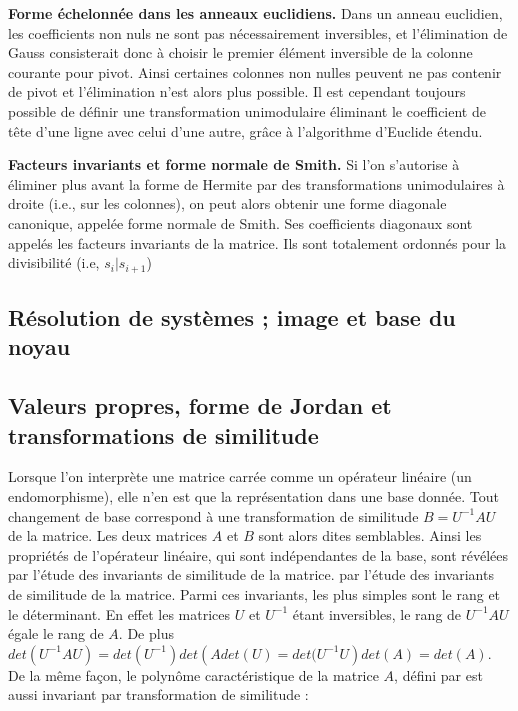 \begin{flushleft}
\textbf{Forme échelonnée dans les anneaux euclidiens.} Dans un anneau euclidien, les coefficients non nuls ne sont pas nécessairement inversibles, et l’élimination de Gauss consisterait donc à choisir le premier élément inversible de la colonne courante pour pivot. Ainsi certaines colonnes non nulles peuvent ne pas contenir
de pivot et l’élimination n’est alors plus possible. Il est cependant toujours possible de définir une transformation unimodulaire éliminant le coefficient de tête d’une ligne avec celui d’une autre, grâce à
l’algorithme d’Euclide étendu.
\end{flushleft}

\begin{flushleft}
\textbf{Facteurs invariants et forme normale de Smith.} Si l’on s’autorise à éliminer plus avant la forme de Hermite par des transformations unimodulaires à droite (i.e., sur les colonnes), on peut alors obtenir une forme diagonale canonique, appelée forme normale de Smith. Ses coefficients diagonaux sont appelés les facteurs
invariants de la matrice. Ils sont totalement ordonnés pour la divisibilité (i.e, $s_{i}\vert s_{i+1}$)
\end{flushleft}

\subsection{ Résolution de systèmes ; image et base du noyau}
\subsection{Valeurs propres, forme de Jordan et transformations de similitude}
Lorsque l’on interprète une matrice carrée comme un opérateur linéaire (un endomorphisme), elle n’en est que la représentation dans une base donnée. Tout changement de base correspond à une transformation de similitude 
$B = U^{-1}AU$ de la matrice. Les deux matrices $A$ et $B$ sont alors dites semblables. Ainsi les propriétés de l’opérateur linéaire, qui sont indépendantes de la base, sont révélées par l’étude des invariants de similitude de la matrice.
par l’étude des invariants de similitude de la matrice. Parmi ces invariants, les plus simples sont le rang et le déterminant. En effet les matrices $U$ et $U^{-1}$ étant inversibles, le rang de $U^{-1}AU$ égale le rang de $A$. De plus $det\left( U^{-1}AU\right)  = det\left( U^{-1}\right) det \left(A det(U) = det(U^{-1}U\right) det\left( A\right) = det\left(A\right)$. De
la même façon, le polynôme caractéristique de la matrice $A$, défini par 
 est aussi invariant par transformation de similitude :
%


